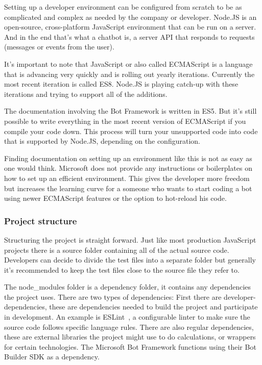 Setting up a developer environment can be configured from scratch to be as complicated and complex as needed by the company or developer. Node.JS is an open-source, cross-platform JavaScript environment that can be run on a server. And in the end that's what a chatbot is, a server API that responds to requests (messages or events from the user).

It's important to note that JavaScript or also called \Gls{ECMAScript} is a language that is advancing very quickly and is rolling out yearly iterations. Currently the most recent iteration is called ES8. Node.JS is playing catch-up with these iterations and trying to support all of the additions.

The documentation involving the Bot Framework is written in \Gls{ES5}. But it's still possible to write everything in the most recent version of ECMAScript if you compile your code down. This process will turn your unsupported code into code that is supported by Node.JS, depending on the configuration.

Finding documentation on setting up an environment like this is not as easy as one would think. Microsoft does not provide any instructions or boilerplates on how to set up an efficient environment. This gives the developer more freedom but increases the learning curve for a someone who wants to start coding a bot using newer ECMAScript features or the option to hot-reload his code.

\subsubsection{Project structure}

Structuring the project is straight forward. Just like most production JavaScript projects there is a source folder containing all of the actual source code. Developers can decide to divide the test files into a separate folder but generally it's recommended to keep the test files close to the source file they refer to.

The node\_modules folder is a dependency folder, it contains any dependencies the project uses. There are two types of dependencies: First there are developer-dependencies, these are dependencies needed to build the project and participate in development. An example is ESLint~\cite{eslint}, a configurable linter to make sure the source code follows specific language rules. There are also regular dependencies, these are external libraries the project might use to do calculations, or wrappers for certain technologies. The Microsoft Bot Framework functions using their Bot Builder \Gls{SDK} as a dependency.

